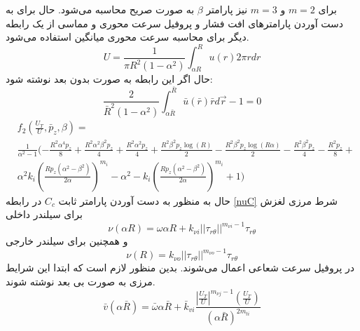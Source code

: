 برای $m = 2$ و $m=3 $ نیز پارامتر $\beta$ به صورت صریح محاسبه می‌شود.
حال برای به دست آوردن پارامتر‌های افت فشار و پروفیل سرعت محوری و مماسی از یک رابطه دیگر برای محاسبه سرعت محوری میانگین استفاده می‌شود.
\begin{equation}
	U=\frac{1}{\pi R^{2}\left(1-\alpha^{2}\right)} \int_{\alpha R}^{R} u(r) 2 \pi r d r
\end{equation}
حال اگر این رابطه به صورت بدون بعد نوشته شود:
\begin{equation}
	\label{aveU}
	\frac{2}{\bar{R}^{2}\left(1-\alpha^{2}\right)} \int_{\alpha \bar{R}}^{\bar{R}} \bar{u}(\bar{r}) \bar{r} d \vec{r}-1=0
\end{equation}
	\begin{equation}
		\begin{aligned}
		&f_{2}\left(\frac{U_{T}}{U}, \bar{p}_{z}, \beta\right) =\\
		&\frac{1}{\alpha^2-1}(- \frac{R^{2} \alpha^{4} p_{z}}{8} + \frac{R^{2} \alpha^{2} \beta^{2} p_{z}}{4} + \frac{R^{2} \alpha^{2} p_{z}}{4} + \frac{R^{2} \beta^{2} p_{z} \log{\left(R \right)}}{2} - \frac{R^{2} \beta^{2} p_{z} \log{\left(R \alpha \right)}}{2} - \frac{R^{2} \beta^{2} p_{z}}{4} - \frac{R^{2} p_{z}}{8} +\\ &\alpha^{2} k_{i} \left(\frac{R p_{z} \left(\alpha^{2} - \beta^{2}\right)}{2 \alpha}\right)^{m_{i}} - \alpha^{2} - k_{i} \left(\frac{R p_{z} \left(\alpha^{2} - \beta^{2}\right)}{2 \alpha}\right)^{m_{i}} + 1)
	\end{aligned}
	\end{equation}
حال به منظور به دست آوردن پارامتر ثابت $C_c$ در رابطه
\ref{nuC}
شرط مرزی لغزش برای سیلندر داخلی
\begin{equation}
	\nu(\alpha R) = \omega \alpha R + k_{\nu i}||\tau_{r \theta}||^{m_{\nu i}-1}\tau_{r \theta}
\end{equation}
و همچنین برای سیلندر خارجی
\begin{equation}
	\nu(R) = k_{\nu o}||\tau_{r \theta}||^{m_{\nu o}-1}\tau_{r \theta}
\end{equation}
در پروفیل سرعت شعاعی اعمال می‌شوند. بدین منظور لازم است که ابتدا این شرایط مرزی به صورت بی بعد نوشته شوند.
\begin{equation}
	\label{nu_alphaR}
	\bar{v}(\alpha \bar{R})=\bar{\omega} \alpha \bar{R}+\bar{k}_{v i} \frac{\left|\frac{U_{T}}{U}\right|^{m_{\nu j}-1}\left(\frac{U_{T}}{U}\right)}{(\alpha \bar{R})^{2 m_{t i}}}
\end{equation}
